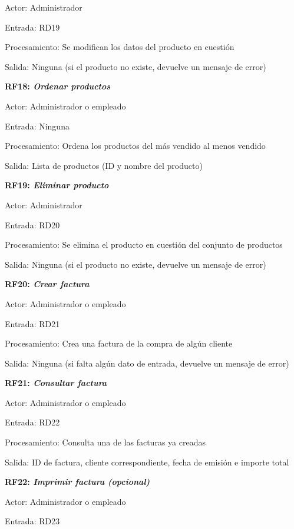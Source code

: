 \documentclass[paper=a4, fontsize=11pt, spanish]{scrartcl}
\begin{document}
	Actor: Administrador
	
	Entrada: RD19
	
	Procesamiento: Se modifican los datos del producto en cuestión
	
	Salida: Ninguna (si el producto no existe, devuelve un mensaje de error)
	
	\setlength{\parindent}{0em}
	\textbf{RF18: \textit{Ordenar productos}}
	\setlength{\parindent}{2em}
	
	Actor: Administrador o empleado
	
	Entrada: Ninguna
	
	Procesamiento: Ordena los productos del más vendido al menos vendido
	
	Salida: Lista de productos (ID y nombre del producto)
	
	\setlength{\parindent}{0em}
	\textbf{RF19: \textit{Eliminar producto}}
	\setlength{\parindent}{2em}
	
	Actor: Administrador
	
	Entrada: RD20
	
	Procesamiento: Se elimina el producto en cuestión del conjunto de productos 
	
	Salida: Ninguna (si el producto no existe, devuelve un mensaje de error)
	
	\setlength{\parindent}{0em}
	\textbf{RF20: \textit{Crear factura}}
	\setlength{\parindent}{2em}
	
	Actor: Administrador o empleado
	
	Entrada: RD21
	
	Procesamiento: Crea una factura de la compra de algún cliente 
	
	Salida: Ninguna (si falta algún dato de entrada, devuelve un mensaje de error)
	
	\setlength{\parindent}{0em}
	\textbf{RF21: \textit{Consultar factura}}
	\setlength{\parindent}{2em}
	
	Actor: Administrador o empleado
	
	Entrada: RD22
	
	Procesamiento: Consulta una de las facturas ya creadas 
	
	Salida: ID de factura, cliente correspondiente, fecha de emisión e importe total
	
	\setlength{\parindent}{0em}
	\textbf{RF22: \textit{Imprimir factura (opcional)}}
	\setlength{\parindent}{2em}
	
	Actor: Administrador o empleado
	
	Entrada: RD23
	
\end{document}
